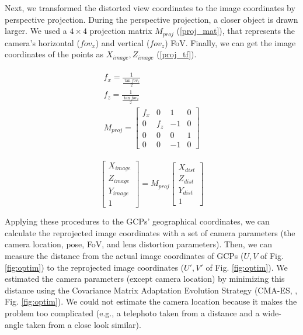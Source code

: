 \documentclass{article}
\begin{document}
Next, we transformed the distorted view coordinates to the image coordinates by perspective projection. During the perspective projection, a closer object is drawn larger. We used a \(4 \times 4\) projection matrix \(M_{proj}\) (\ref{proj_mat}), that represents the camera's horizontal (\(fov_x\)) and vertical (\(fov_z\)) FoV. Finally, we can get the image coordinates of the points as \(X_{image}, Z_{image}\) (\ref{proj_tf}).

\begin{gather}
\label{proj_mat}
  \begin{gathered}
  f_x = \frac{1}{\frac{\tan fov_x}{2}} \\
  f_z = \frac{1}{\frac{\tan fov_z}{2}} \\
  M_{proj} = 
  \begin{bmatrix} 
    f_x & 0 & 1 & 0\\ 
    0 & f_z & -1 & 0 \\ 
    0 & 0 & 0 & 1\\ 
    0 & 0 & -1 & 0 
  \end{bmatrix}
  \end{gathered}
\end{gather}

\begin{equation}
\label{proj_tf}
  \begin{bmatrix} 
    X_{image} \\ Z_{image} \\ Y_{image} \\ 1 
  \end{bmatrix}
  =
  M_{proj}
  \begin{bmatrix} 
    X_{dist} \\ Z_{dist} \\ Y_{dist} \\ 1 
  \end{bmatrix}
\end{equation}

Applying these procedures to the GCPs' geographical coordinates, we can calculate the reprojected image coordinates with a set of camera parameters (the camera location, pose, FoV, and lens distortion parameters). Then, we can measure the distance from the actual image coordinates of GCPs (\(U, V\) of Fig. \ref{fig:optim}) to the reprojected image coordinates (\(U', V'\) of Fig. \ref{fig:optim}). We estimated the camera parameters (except camera location) by minimizing this distance using the Covariance Matrix Adaptation Evolution Strategy (CMA-ES, \cite{Hansen2003CMAES}, Fig. \ref{fig:optim}). We could not estimate the camera location because it makes the problem too complicated (e.g., a telephoto taken from a distance and a wide-angle taken from a close look similar).
\end{document}
